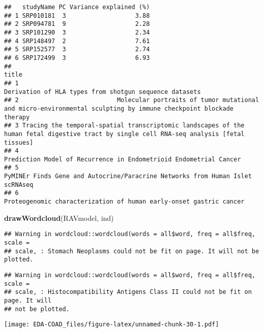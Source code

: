 \documentclass[
]{article}
\newenvironment{Shaded}{\begin{snugshade}}{\end{snugshade}}
\newcommand{\FunctionTok}[1]{\textcolor[rgb]{0.13,0.29,0.53}{\textbf{#1}}}
\newcommand{\NormalTok}[1]{#1}
\begin{document}
\begin{verbatim}
##   studyName PC Variance explained (%)
## 1 SRP010181  3                   3.88
## 2 SRP094781  9                   2.28
## 3 SRP101290  3                   2.34
## 4 SRP148497  2                   7.61
## 5 SRP152577  3                   2.74
## 6 SRP172499  3                   6.93
##                                                                                                                                       title
## 1                                                                                    Derivation of HLA types from shotgun sequence datasets
## 2                           Molecular portraits of tumor mutational and micro-environmental sculpting by immune checkpoint blockade therapy
## 3 Tracing the temporal-spatial transcriptomic landscapes of the human fetal digestive tract by single cell RNA-seq analysis [fetal tissues]
## 4                                                                         Prediction Model of Recurrence in Endometrioid Endometrial Cancer
## 5                                                             PyMINEr Finds Gene and Autocrine/Paracrine Networks from Human Islet scRNAseq
## 6                                                                        Proteogenomic characterization of human early-onset gastric cancer
\end{verbatim}

\begin{Shaded}
\begin{Highlighting}[]
\FunctionTok{drawWordcloud}\NormalTok{(RAVmodel, ind)}
\end{Highlighting}
\end{Shaded}

\begin{verbatim}
## Warning in wordcloud::wordcloud(words = all$word, freq = all$freq, scale =
## scale, : Stomach Neoplasms could not be fit on page. It will not be plotted.
\end{verbatim}

\begin{verbatim}
## Warning in wordcloud::wordcloud(words = all$word, freq = all$freq, scale =
## scale, : Histocompatibility Antigens Class II could not be fit on page. It will
## not be plotted.
\end{verbatim}

\texttt{[image: EDA-COAD\_files/figure-latex/unnamed-chunk-30-1.pdf]}
\end{document}
